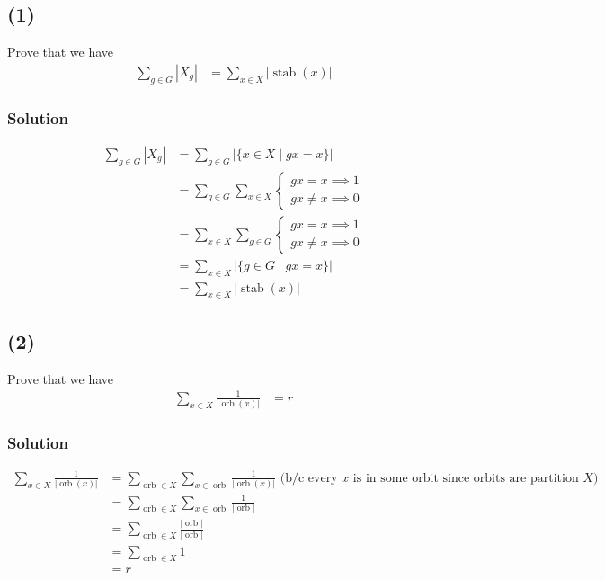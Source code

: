 \documentclass[fleqn]{article}
\DeclareMathOperator{\orb}{orb}
\DeclareMathOperator{\stab}{stab}
\begin{document}
        \subsection{(1)}
        Prove that we have
        \begin{align}
            \sum\limits_{g \in G} |X_g| &= \sum\limits_{x \in X} |\stab(x)|
        \end{align}
            
            \subsubsection{Solution}
            \begin{align}
                \sum\limits_{g \in G} |X_g| 
                    &= \sum\limits_{g \in G} |\{x \in X \mid gx = x\}| \\
                    &= \sum\limits_{g \in G} \sum\limits_{x \in X} \begin{cases}
                        gx = x \implies 1 \\
                        gx \neq x \implies 0
                    \end{cases} \\
                    &= \sum\limits_{x \in X} \sum\limits_{g \in G} \begin{cases}
                        gx = x \implies 1 \\
                        gx \neq x \implies 0
                    \end{cases} \\
                    &= \sum\limits_{x \in X} |\{g \in G \mid gx = x\}| \\
                    &= \sum\limits_{x \in X} |\stab(x)|
            \end{align}
        
        \subsection{(2)}
        Prove that we have
        \begin{align}
            \sum\limits_{x \in X} \frac{1}{|\orb(x)|} &= r
        \end{align}
            
            \subsubsection{Solution}
            \begin{align}
                \sum\limits_{x \in X} \frac{1}{|\orb(x)|}
                    &= \sum\limits_{\orb \in X} \sum\limits_{x \in \orb} \frac{1}{|\orb(x)|} \text{ (b/c every $x$ is in some orbit since orbits are partition $X$)} \\
                    &= \sum\limits_{\orb \in X} \sum\limits_{x \in \orb} \frac{1}{|\orb|} \\
                    &= \sum\limits_{\orb \in X} \frac{|\orb|}{|\orb|} \\
                    &= \sum\limits_{\orb \in X} 1 \\
                    &= r
            \end{align}
        
\end{document}
